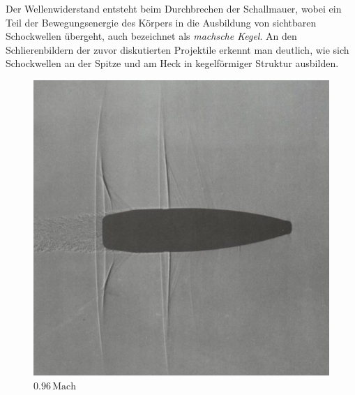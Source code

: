Der Wellenwiderstand entsteht beim Durchbrechen 
der Schallmauer, wobei ein Teil der Bewegungsenergie 
des Körpers in die Ausbildung von sichtbaren Schockwellen übergeht,
auch bezeichnet als \emph{machsche Kegel}.
%
%
An den Schlierenbildern der zuvor diskutierten Projektile 
%
erkennt man deutlich,
wie sich Schockwellen an der Spitze und am Heck 
in kegelförmiger Struktur ausbilden.
\begin{figure}
    \centering
    \begin{minipage}[b]{0.32\textwidth}
        \centering
        \includegraphics[width=\linewidth]{papers/ueberschall/figures/0.96_mach_projektil.jpg}
        \caption*{$0.96\,\mathrm{Mach}$}
    \end{minipage}
    \hfill
    \begin{minipage}[b]{0.32\textwidth}
        \centering

\end{minipage}
\end{figure}
